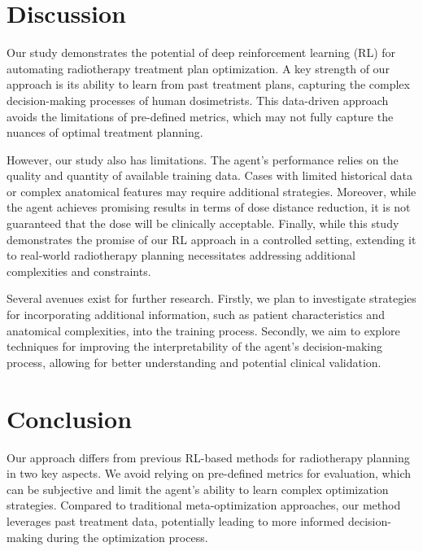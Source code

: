 \section{Discussion}
Our study demonstrates the potential of deep reinforcement learning (RL) for automating radiotherapy treatment plan optimization.
A key strength of our approach is its ability to learn from past treatment plans, capturing the complex decision-making processes of human dosimetrists.
This data-driven approach avoids the limitations of pre-defined metrics, which may not fully capture the nuances of optimal treatment planning.

However, our study also has limitations.
The agent's performance relies on the quality and quantity of available training data.
Cases with limited historical data or complex anatomical features may require additional strategies.
Moreover, while the agent achieves promising results in terms of dose distance reduction, it is not guaranteed that the dose will be clinically acceptable.
Finally,  while this study demonstrates the promise of our RL approach in a controlled setting, extending it to real-world radiotherapy planning necessitates addressing additional complexities and constraints.


Several avenues exist for further research.
Firstly, we plan to investigate strategies for incorporating additional information, such as patient characteristics and anatomical complexities, into the training process.
Secondly, we aim to explore techniques for improving the interpretability of the agent's decision-making process, allowing for better understanding and potential clinical validation.

\section{Conclusion}
Our approach differs from previous RL-based methods for radiotherapy planning in two key aspects.
We avoid relying on pre-defined metrics for evaluation, which can be subjective and limit the agent's ability to learn complex optimization strategies.
Compared to traditional meta-optimization approaches, our method leverages past treatment data, potentially leading to more informed decision-making during the optimization process.

